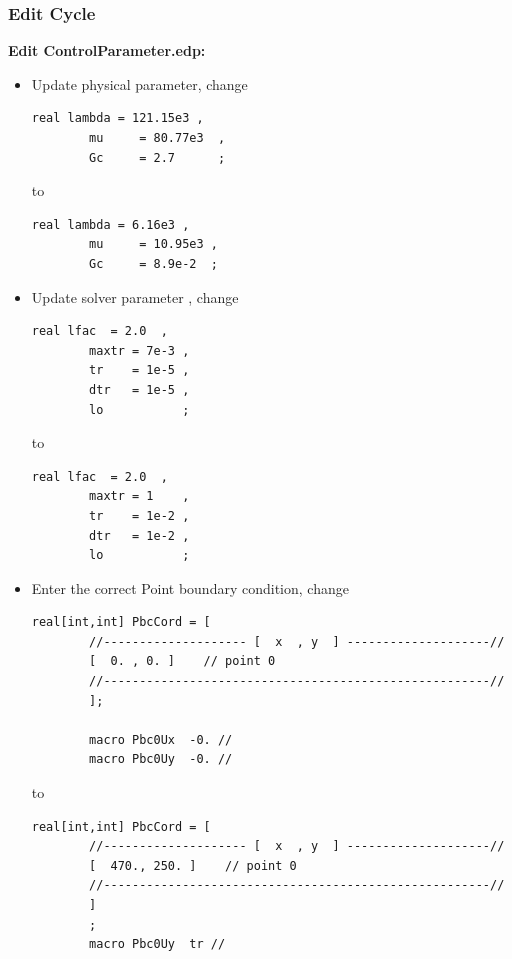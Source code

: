 {{\subsubsection{Edit Cycle}

\textbf{Edit ControlParameter.edp:}

\begin{itemize}
	
	\item Update physical parameter, change
	
	\begin{lstlisting}[style=CppStyle]
		real lambda = 121.15e3 ,
		mu     = 80.77e3  ,
		Gc     = 2.7      ; 
	\end{lstlisting}
	
	to
	
	\begin{lstlisting}[style=CppStyle]
		real lambda = 6.16e3 ,
		mu     = 10.95e3 ,
		Gc     = 8.9e-2  ;
	\end{lstlisting}
	
	\item Update solver parameter , change
	
	\begin{lstlisting}[style=CppStyle]
		real lfac  = 2.0  ,
		maxtr = 7e-3 ,
		tr    = 1e-5 ,
		dtr   = 1e-5 ,
		lo           ; 
	\end{lstlisting}
	
	to
	
	\begin{lstlisting}[style=CppStyle]
		real lfac  = 2.0  ,
		maxtr = 1    ,
		tr    = 1e-2 ,
		dtr   = 1e-2 ,
		lo           ; 
	\end{lstlisting}
	
	
	\item Enter the correct Point boundary condition, change
	
	\begin{lstlisting}[style=CppStyle]
		real[int,int] PbcCord = [
		//-------------------- [  x  , y  ] --------------------//
		[  0. , 0. ]    // point 0                       
		//------------------------------------------------------//
		];
		
		macro Pbc0Ux  -0. //
		macro Pbc0Uy  -0. //
	\end{lstlisting}
	
	to 
	
	\begin{lstlisting}[style=CppStyle]
		real[int,int] PbcCord = [
		//-------------------- [  x  , y  ] --------------------//
		[  470., 250. ]    // point 0                       
		//------------------------------------------------------//
		]
		;
		macro Pbc0Uy  tr //
	\end{lstlisting}
	

\end{itemize}}}
